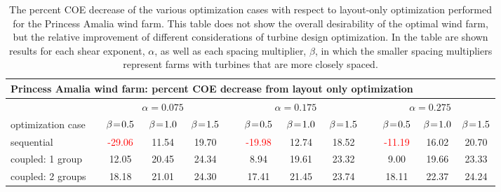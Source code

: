 \begin{center}
\begin{table}
\caption{The percent COE decrease of the various optimization cases with respect to layout-only optimization performed for the Princess Amalia wind farm. This table does not show the overall desirability of the optimal wind farm, but the relative improvement of different considerations of turbine design optimization. In the table are shown results for each shear exponent, $\alpha$, as well as each spacing multiplier, $\beta$, in which the smaller spacing multipliers represent farms with turbines that are more closely spaced.}
\label{amalia_table}
\begin{tabular}{p{2.5cm} c c c c c c c c c c c}
\hline
\multicolumn{10}{c}{\textbf{Princess Amalia wind farm: percent COE decrease from layout only optimization}}\\
\hline
 & \multicolumn{3}{c}{$\alpha=0.075$} & \multicolumn{4}{c}{$\alpha=0.175$} & \multicolumn{4}{c}{$\alpha=0.275$}\\
\hline
optimization case & $\beta\mkern1.5mu{=}\mkern1.5mu0.5$ & $\beta\mkern1.5mu{=}\mkern1.5mu1.0$ & $\beta\mkern1.5mu{=}\mkern1.5mu1.5$ & & $\beta\mkern1.5mu{=}\mkern1.5mu0.5$ & $\beta\mkern1.5mu{=}\mkern1.5mu1.0$ & $\beta\mkern1.5mu{=}\mkern1.5mu1.5$& &$\beta\mkern1.5mu{=}\mkern1.5mu0.5$ & $\beta\mkern1.5mu{=}\mkern1.5mu1.0$ & $\beta\mkern1.5mu{=}\mkern1.5mu1.5$\\
sequential & \textcolor{red}{-29.06} & 11.54 & 19.70 & & \textcolor{red}{-19.98}  & 12.74 & 18.52 & & \textcolor{red}{-11.19}  & 16.02 & 20.70\\
coupled: 1 group& 12.05  & 20.45  & 24.34  & & 8.94  & 19.61  & 23.32 & & 9.00 & 19.66 & 23.33 \\
coupled: 2 groups & 18.18  & 21.01  & 24.30 & & 17.41  & 21.45  &  23.74 & &  18.11 & 22.37  & 24.24\\
\hline
\end{tabular}
\end{table}
\end{center}



